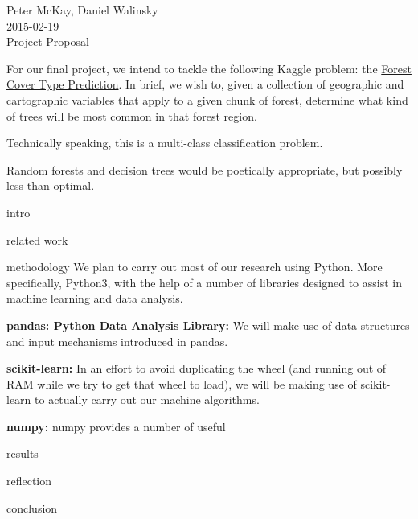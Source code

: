 \documentclass{article}
\begin{document}
\begin{center}
Peter McKay, Daniel Walinsky\\
2015-02-19\\
\Large Project Proposal
\end{center}

\bigskip
For our final project, we intend to tackle the following Kaggle problem:
the 
\href{http://www.kaggle.com/c/forest-cover-type-prediction}{Forest Cover Type Prediction}.
In brief, we wish to, given a collection of geographic and cartographic 
variables that apply to a given chunk of forest, determine what kind of 
trees will be most common in that forest region.  

Technically speaking, this is a multi-class classification problem.  


Random forests and 
decision trees would be poetically appropriate, but possibly less than 
optimal.

intro

related work

methodology
We plan to carry out most of our research using Python.  More 
specifically, Python3, with the help of a number of libraries designed 
to assist in machine learning and data analysis.  

\textbf{pandas: Python Data Analysis Library:}
We will make use of data structures and input mechanisms introduced in 
pandas.

\textbf{scikit-learn:}
In an effort to avoid duplicating the wheel (and running out of RAM 
while we try to get that wheel to load), we will be making use of 
scikit-learn to actually carry out our machine algorithms.

\textbf{numpy:}
numpy provides a number of useful 



results

reflection

conclusion
\end{document}
